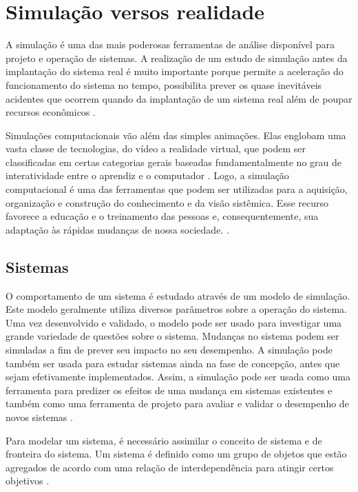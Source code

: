 

\section{Simulação versos realidade}

A simulação é uma das mais poderosas ferramentas de análise disponível para projeto e operação de sistemas. A realização de um estudo de simulação antes da implantação do sistema real é muito importante porque permite a aceleração do funcionamento do sistema no tempo, possibilita prever os quase inevitáveis acidentes que ocorrem quando da implantação de um sistema real além de poupar recursos econômicos \cite{lobao1999evoluccao}.

Simulações computacionais vão além das simples animações. Elas englobam uma vasta classe de tecnologias, do vídeo a realidade virtual, que podem ser classificadas em certas categorias gerais baseadas fundamentalmente no grau de interatividade entre o aprendiz e o computador \cite{gaddis2000learning}. Logo, a simulação computacional é uma das ferramentas que podem ser utilizadas para a aquisição, organização e construção do conhecimento e da visão sistêmica. Esse recurso favorece a educação e o treinamento das pessoas e, consequentemente, sua adaptação às rápidas mudanças de nossa sociedade. \cite{de2014simulaccao}.


\subsection{Sistemas}

O comportamento de um sistema é estudado através de um modelo de simulação. Este modelo geralmente utiliza diversos parâmetros sobre a operação do sistema. Uma vez desenvolvido e validado, o modelo pode ser usado para investigar uma grande variedade de questões sobre o sistema. Mudanças no sistema podem ser simuladas a fim de prever seu impacto no seu desempenho. A simulação pode também ser usada para estudar sistemas ainda na fase de concepção, antes que sejam efetivamente implementados. Assim, a simulação pode ser usada como uma ferramenta para predizer os efeitos de uma mudança em sistemas existentes e também como uma ferramenta de projeto para avaliar e validar o desempenho de novos sistemas \cite{miyagi2006introduccao}.

Para modelar um sistema, é necessário assimilar o conceito de sistema e de fronteira do sistema. Um sistema é definido como um grupo de objetos que estão agregados de acordo com uma relação de interdependência para atingir certos objetivos \cite{miyagi2006introduccao}. 

